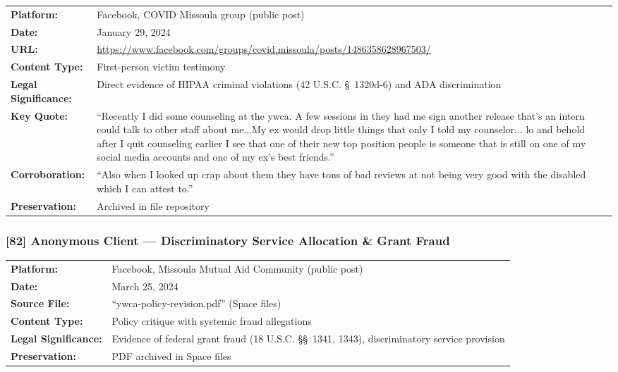 \documentclass[11pt,letterpaper]{article}
\newcommand{\citeref}[1]{\textbf{\color{NavyBlue}[#1]}}
\begin{document}
\begin{tabular}{@{}p{1.4in}p{4.6in}@{}}
\textbf{Platform:} & Facebook, COVID Missoula group (public post)\\
\textbf{Date:} & January 29, 2024\\
\textbf{URL:} & \url{https://www.facebook.com/groups/covid.missoula/posts/1486358628967503/}\\
\textbf{Content Type:} & First-person victim testimony\\
\textbf{Legal Significance:} & Direct evidence of HIPAA criminal violations (42 U.S.C. \S~1320d-6) and ADA discrimination\\
\textbf{Key Quote:} & ``Recently I did some counseling at the ywca. A few sessions in they had me sign another release that's an intern could talk to other staff about me...My ex would drop little things that only I told my counselor... lo and behold after I quit counseling earlier I see that one of their new top position people is someone that is still on one of my social media accounts and one of my ex's best friends.''\\
\textbf{Corroboration:} & ``Also when I looked up crap about them they have tons of bad reviews at not being very good with the disabled which I can attest to.''\\
\textbf{Preservation:} & Archived in file repository\\
\end{tabular}

\vspace{0.2in}

\subsubsection{\citeref{82} Anonymous Client --- Discriminatory Service Allocation \& Grant Fraud}

\begin{tabular}{@{}p{1.4in}p{4.6in}@{}}
\textbf{Platform:} & Facebook, Missoula Mutual Aid Community (public post)\\
\textbf{Date:} & March 25, 2024\\
\textbf{Source File:} & ``ywca-policy-revision.pdf'' (Space files)\\
\textbf{Content Type:} & Policy critique with systemic fraud allegations\\
\textbf{Legal Significance:} & Evidence of federal grant fraud (18 U.S.C. \S\S~1341, 1343), discriminatory service provision\\
\textbf{Preservation:} & PDF archived in Space files\\
\end{tabular}
\end{document}
